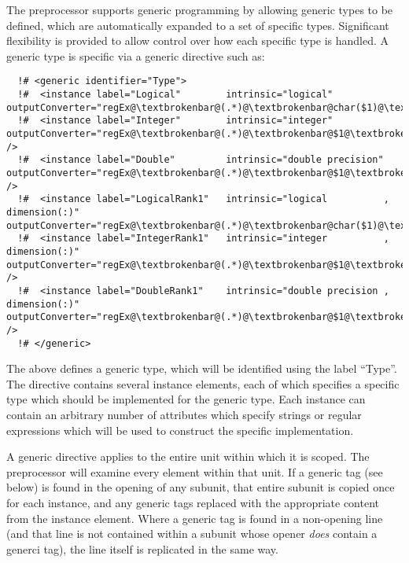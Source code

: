 The preprocessor supports generic programming by allowing generic types to be defined, which are automatically expanded to a set of specific types. Significant flexibility is provided to allow control over how each specific type is handled. A generic type is specific via a {\normalfont \ttfamily generic} directive such as:
\lstset{escapechar=@}
\begin{lstlisting}
  !# <generic identifier="Type">
  !#  <instance label="Logical"        intrinsic="logical"                         outputConverter="regEx@\textbrokenbar@(.*)@\textbrokenbar@char($1)@\textbrokenbar@"/>
  !#  <instance label="Integer"        intrinsic="integer"                         outputConverter="regEx@\textbrokenbar@(.*)@\textbrokenbar@$1@\textbrokenbar@"      />
  !#  <instance label="Double"         intrinsic="double precision"                outputConverter="regEx@\textbrokenbar@(.*)@\textbrokenbar@$1@\textbrokenbar@"      />
  !#  <instance label="LogicalRank1"   intrinsic="logical          , dimension(:)" outputConverter="regEx@\textbrokenbar@(.*)@\textbrokenbar@char($1)@\textbrokenbar@"/>
  !#  <instance label="IntegerRank1"   intrinsic="integer          , dimension(:)" outputConverter="regEx@\textbrokenbar@(.*)@\textbrokenbar@$1@\textbrokenbar@"      />
  !#  <instance label="DoubleRank1"    intrinsic="double precision , dimension(:)" outputConverter="regEx@\textbrokenbar@(.*)@\textbrokenbar@$1@\textbrokenbar@"      />
  !# </generic>
\end{lstlisting}
The above defines a generic type, which will be identified using the label ``{\normalfont \ttfamily Type}''. The directive contains several {\normalfont \ttfamily instance} elements, each of which specifies a specific type which should be implemented for the generic type. Each instance can contain an arbitrary number of attributes which specify strings or regular expressions which will be used to construct the specific implementation.

A generic directive applies to the entire unit within which it is scoped. The preprocessor will examine every element within that unit. If a generic tag (see below) is found in the opening of any subunit, that entire subunit is copied once for each instance, and any generic tags replaced with the appropriate content from the {\normalfont \ttfamily instance} element. Where a generic tag is found in a non-opening line (and that line is not contained within a subunit whose opener \emph{does} contain a generci tag), the line itself is replicated in the same way.

